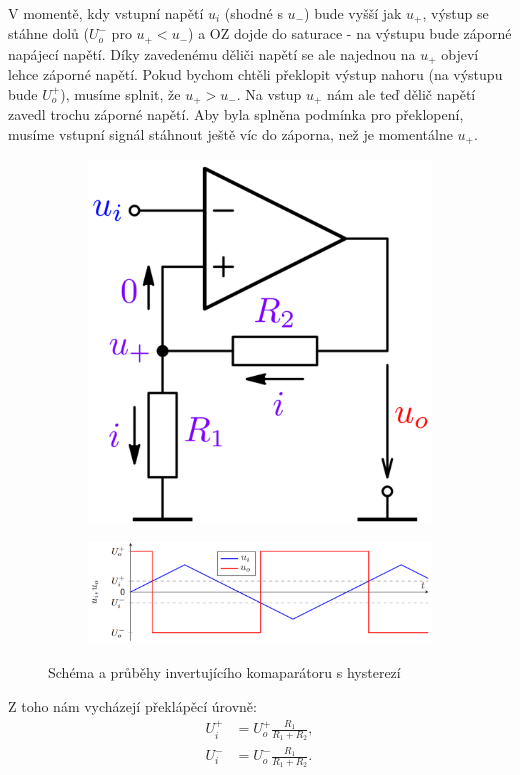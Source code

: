 \documentclass[a4paper,12pt]{article}   %
\begin{document}
V momentě, kdy vstupní napětí $u_i$ (shodné s $u_-$) bude vyšší jak $u_+$, výstup se stáhne dolů ($U_o^-$ pro $u_+ < u_-$) a OZ dojde do saturace - na výstupu bude záporné napájecí napětí. Díky zavedenému děliči napětí se ale najednou na $u_+$ objeví lehce záporné napětí. Pokud bychom chtěli překlopit výstup nahoru (na výstupu bude $U_o^+$), musíme splnit, že $u_+ > u_-$. Na vstup $u_+$ nám ale teď dělič napětí zavedl trochu záporné napětí. Aby byla splněna podmínka pro překlopení, musíme vstupní signál stáhnout ještě víc do záporna, než je momentálne $u_+$.
\begin{figure}[h!]
    \centering
    \begin{subfigure}{.3\textwidth}
        \centering
        \includegraphics[width=\textwidth]{komparator-invert.PNG}
    \end{subfigure}
    \begin{subfigure}{.65\textwidth}
        \centering
        \includegraphics[width=\textwidth]{komparator-invert-graf.PNG}
    \end{subfigure}
    \caption{Schéma a průběhy invertujícího komaparátoru s hysterezí}
\end{figure}
Z toho nám vycházejí překlápěcí úrovně:\\
\begin{align*}
    U_i^+ &= U_o^+\frac{R_1}{R_1 + R_2},\\
    U_i^- &= U_o^-\frac{R_1}{R_1 + R_2}.\\
\end{align*}
\end{document}
